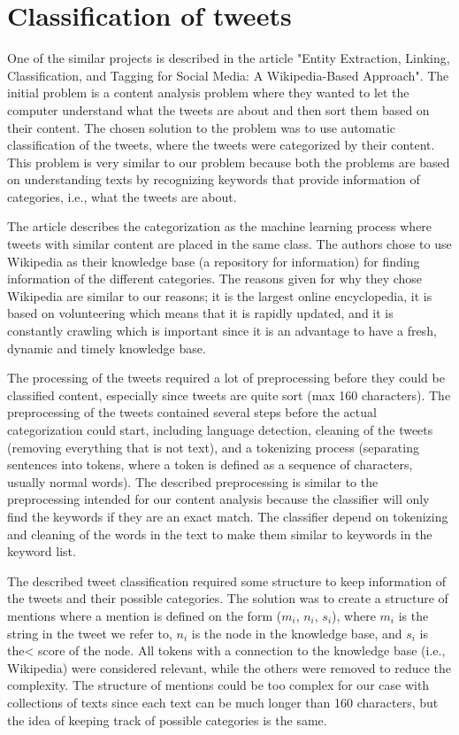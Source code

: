 \section{Classification of tweets}
One of the similar projects is described in the article "Entity Extraction, Linking, Classification, and Tagging for Social Media: A Wikipedia-Based Approach"\cite{entityextraction}. The initial problem is a content analysis problem where they wanted to let the computer understand what the tweets are about and then sort them based on their content. The chosen solution to the problem was to use automatic classification of the tweets, where the tweets were categorized by their content. This problem is very similar to our problem because both the problems are based on understanding texts by recognizing keywords that provide information of categories, i.e., what the tweets are about.

The article describes the categorization as the machine learning process where tweets with similar content are placed in the same class. The authors chose to use Wikipedia as their knowledge base (a repository for information) for finding information of the different categories. The reasons given for why they chose Wikipedia are similar to our reasons;  it is the largest online encyclopedia, it is based on volunteering which means that it is rapidly updated, and it is constantly crawling which is important since it is an advantage to have a fresh, dynamic and timely knowledge base. 

The processing of the tweets required a lot of preprocessing before they could be classified content, especially since tweets are quite sort (max 160 characters).  The preprocessing of the tweets contained several steps before the actual categorization could start, including language detection, cleaning of the tweets (removing everything that is not text), and a tokenizing process (separating sentences into tokens, where a token is defined as a sequence of characters, usually normal words). The described preprocessing is similar to the preprocessing intended for our content analysis because the classifier will only find the keywords if they are an exact match. The classifier depend on tokenizing and cleaning of the words in the text to make them similar to keywords in the keyword list.  

The described tweet classification required some structure to keep information of the tweets and their possible categories. The solution was to create a structure of mentions where a mention is defined on the form ($m_{i}$, $n_{i}$, $s_{i}$), where $m_{i}$ is the string in the tweet we refer to, $n_{i}$ is the node in the knowledge base, and  $s_{i}$ is the< score of the node. All tokens with a connection to the knowledge base (i.e., Wikipedia) were considered relevant, while the others were removed to reduce the complexity. The structure of mentions could be too complex for our case with collections of texts since each text can be much longer than 160 characters, but the idea of keeping track of possible categories is the same. 

